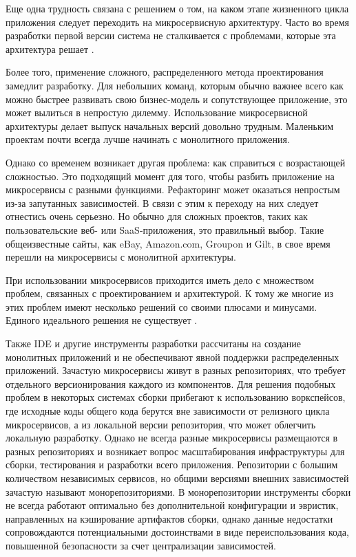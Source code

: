 Еще одна трудность связана с решением о том, на каком этапе жизненного цикла
приложения следует переходить на микросервисную архитектуру. Часто во время
разработки первой версии система не сталкивается с проблемами, которые эта
архитектура решает \cite{kaban}. 

Более того, применение сложного, распределенного метода
проектирования замедлит разработку. Для небольших команд, которым обычно важнее всего
как можно быстрее развивать свою бизнес-модель и сопутствующее приложение, это
может вылиться в непростую дилемму. Использование микросервисной архитектуры делает выпуск начальных версий довольно трудным. Маленьким проектам почти всегда
лучше начинать с монолитного приложения.

Однако со временем возникает другая проблема: как справиться с возрастающей сложностью. Это подходящий момент для того, чтобы разбить приложение
на микросервисы с разными функциями. Рефакторинг может оказаться непростым
из-за запутанных зависимостей. В связи с этим к переходу на них следует отнестись очень серьезно. Но обычно для сложных проектов, таких как пользовательские веб- или
SaaS-приложения, это правильный выбор. Такие общеизвестные сайты, как eBay, Amazon.com, Groupon и Gilt, в свое время перешли на микросервисы с монолитной архитектуры.

При использовании микросервисов приходится иметь дело с множеством проблем, связанных с проектированием и архитектурой.
К тому же многие из этих
проблем имеют несколько решений со своими плюсами и минусами. Единого
идеального решения не существует \cite{micro-1}.

Также IDE и другие инструменты разработки рассчитаны на создание монолитных
приложений и не обеспечивают явной поддержки распределенных приложений. Зачастую микросервисы живут в разных репозиториях, что
требует отдельного версионирования каждого из компонентов. Для решения подобных проблем в некоторых системах сборки прибегают к использованию
воркспейсов, где исходные коды общего кода берутся вне зависимости от релизного цикла микросервисов, а из локальной версии репозитория,
что может облегчить локальную разработку. Однако не всегда разные микросервисы размещаются в разных репозиториях и возникает вопрос
масштабирования инфраструктуры для сборки, тестирования и разработки всего приложения. Репозитории с большим количеством независимых сервисов, но
общими версиями внешних зависимостей зачастую называют монорепозиториями. В монорепозитории инструменты сборки не всегда работают оптимально
без дополнительной конфигурации и эвристик, направленных на кэширование артифактов сборки, однако данные недостатки сопровождаются потенциальными
достоинствами в виде переиспользования кода, повышенной безопасности за счет централизации зависимостей.


